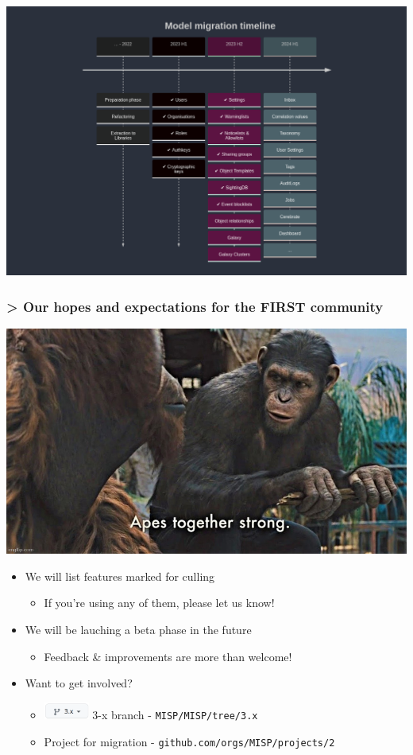 \begin{frame}
    \begin{center}
        \includegraphics[width=0.99\linewidth]{pictures/timeline.png}
    \end{center}
\end{frame}

\begin{frame}
    \frametitle{> Our hopes and expectations for the FIRST community}
    \begin{center}
        \includegraphics[width=0.50\linewidth]{pictures/apes-together-strong.jpeg}
    \end{center}
    \begin{itemize}
        \item We will list features marked for culling
        \begin{itemize}
            \item If you're using any of them, please let us know!
        \end{itemize}
        \item We will be lauching a beta phase in the future
        \begin{itemize}
            \item Feedback \& improvements are more than welcome!
        \end{itemize}
        \item Want to get involved?
        \begin{itemize}
            \item \includegraphics[width=4em]{pictures/3x-branch.png} 3-x branch - \texttt{\scriptsize MISP/MISP/tree/3.x}
            \item {} Project for migration - \texttt{\scriptsize github.com/orgs/MISP/projects/2}
        \end{itemize}
    \end{itemize}
\end{frame}
